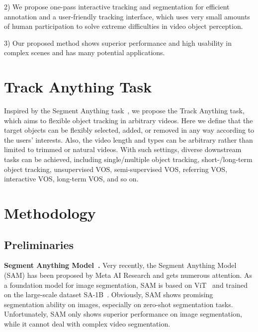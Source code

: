\documentclass{article}
\begin{document}
2) We propose one-pass interactive tracking and segmentation for efficient annotation and a user-friendly tracking interface, which uses very small amounts of human participation to solve extreme difficulties in video object perception.

3) Our proposed method shows superior performance and high usability in complex scenes and has many potential applications.





\section{Track Anything Task}

Inspired by the Segment Anything task~\cite{sam}, we propose the Track Anything task, which aims to flexible object tracking in arbitrary videos.
Here we define that the target objects can be flexibly selected, added, or removed in any way according to the users' interests.
Also, the video length and types can be arbitrary rather than limited to trimmed or natural videos.
With such settings, diverse downstream tasks can be achieved, including single/multiple object tracking, short-/long-term object tracking, unsupervised VOS, semi-supervised VOS, referring VOS, interactive VOS, long-term VOS, and so on.

\section{Methodology}

\subsection{Preliminaries}

\textbf{Segment Anything Model~\cite{sam}.}
Very recently, the Segment Anything Model (SAM) has been proposed by Meta AI Research and gets numerous attention.
As a foundation model for image segmentation, SAM is based on ViT~\cite{vit} and trained on the large-scale dataset SA-1B~\cite{sam}.
Obviously, SAM shows promising segmentation ability on images, especially on zero-shot segmentation tasks.
Unfortunately, SAM only shows superior performance on image segmentation, while it cannot deal with complex video segmentation.
\end{document}
